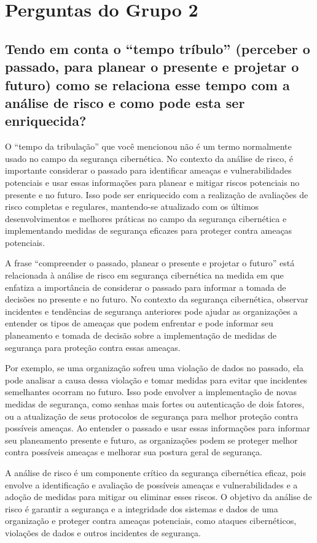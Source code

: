 \chapter{Perguntas do Grupo 2}

\section[Pergunta]{Tendo em conta o ``tempo tríbulo'' (perceber o passado, para planear o presente e projetar o futuro) como se relaciona esse tempo com a análise de risco e como pode esta ser enriquecida?}

O ``tempo da tribulação'' que você mencionou não é um termo normalmente usado no campo da segurança cibernética. No contexto da análise de risco, é importante considerar o passado para identificar ameaças e vulnerabilidades potenciais e usar essas informações para planear e mitigar riscos potenciais no presente e no futuro. Isso pode ser enriquecido com a realização de avaliações de risco completas e regulares, mantendo-se atualizado com os últimos desenvolvimentos e melhores práticas no campo da segurança cibernética e implementando medidas de segurança eficazes para proteger contra ameaças potenciais.

A frase ``compreender o passado, planear o presente e projetar o futuro'' está relacionada à análise de risco em segurança cibernética na medida em que enfatiza a importância de considerar o passado para informar a tomada de decisões no presente e no futuro. No contexto da segurança cibernética, observar incidentes e tendências de segurança anteriores pode ajudar as organizações a entender os tipos de ameaças que podem enfrentar e pode informar seu planeamento e tomada de decisão sobre a implementação de medidas de segurança para proteção contra essas ameaças.

Por exemplo, se uma organização sofreu uma violação de dados no passado, ela pode analisar a causa dessa violação e tomar medidas para evitar que incidentes semelhantes ocorram no futuro. Isso pode envolver a implementação de novas medidas de segurança, como senhas mais fortes ou autenticação de dois fatores, ou a atualização de seus protocolos de segurança para melhor proteção contra possíveis ameaças. Ao entender o passado e usar essas informações para informar seu planeamento presente e futuro, as organizações podem se proteger melhor contra possíveis ameaças e melhorar sua postura geral de segurança.

A análise de risco é um componente crítico da segurança cibernética eficaz, pois envolve a identificação e avaliação de possíveis ameaças e vulnerabilidades e a adoção de medidas para mitigar ou eliminar esses riscos. O objetivo da análise de risco é garantir a segurança e a integridade dos sistemas e dados de uma organização e proteger contra ameaças potenciais, como ataques cibernéticos, violações de dados e outros incidentes de segurança.

